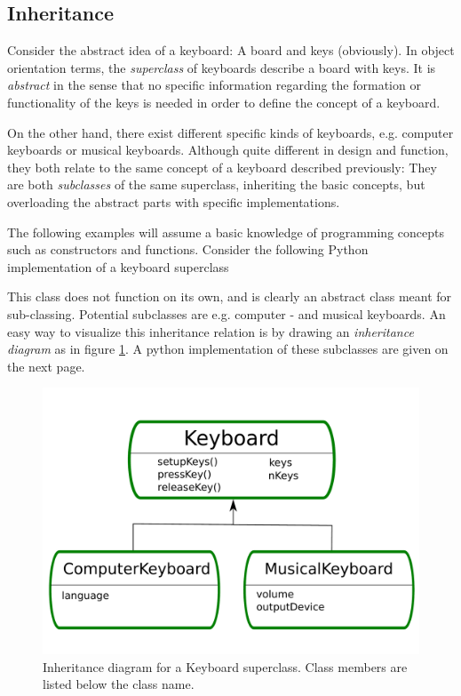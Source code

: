\subsection{Inheritance}

Consider the abstract idea of a keyboard: A board and keys (obviously). In object orientation terms, the \textit{superclass} of keyboards describe a board with keys. It is \textit{abstract} in the sense that no specific information regarding the formation or functionality of the keys is needed in order to define the concept of a keyboard.

On the other hand, there exist different specific kinds of keyboards, e.g. computer keyboards or musical keyboards. Although quite different in design and function, they both relate to the same concept of a keyboard described previously: They are both \textit{subclasses} of the same superclass, inheriting the basic concepts, but overloading the abstract parts with specific implementations. 

The following examples will assume a basic knowledge of programming concepts such as constructors and functions. Consider the following Python implementation of a keyboard superclass

\vspace{0.5cm}



This class does not function on its own, and is clearly an abstract class meant for sub-classing. Potential subclasses are e.g. computer - and musical keyboards. An easy way to visualize this inheritance relation is by drawing an \textit{inheritance diagram} as in figure \ref{fig:UMLkeyboard}. A python implementation of these subclasses are given on the next page. 

\begin{figure}[h]
 \begin{center}
  \includegraphics[scale=0.27]{../Graphics/UMLkeyboard.pdf}
  \caption{Inheritance diagram for a Keyboard superclass. Class members are listed below the class name.}
  \label{fig:UMLkeyboard}
 \end{center}
\end{figure}

